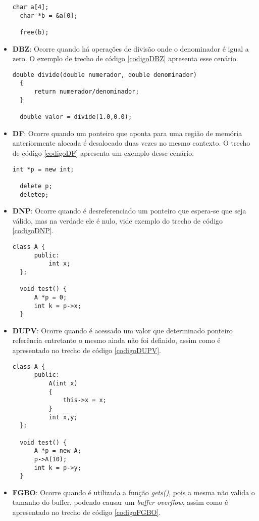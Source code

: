 \begin{itemize}
    \begin{lstlisting}[caption={Código exemplo BF}, label=codigoBF]
  char a[4];
  char *b = &a[0];

  free(b);
    \end{lstlisting}
  \item \textbf{DBZ}: Ocorre quando há operações de divisão onde o denominador é igual a zero. O exemplo de trecho de código 
    \ref{codigoDBZ} apresenta esse cenário.

    \begin{lstlisting}[caption={Código exemplo DBZ}, label=codigoDBZ]
  double divide(double numerador, double denominador)
  {
      return numerador/denominador;
  }

  double valor = divide(1.0,0.0);
    \end{lstlisting}
  \item \textbf{DF}: Ocorre quando um ponteiro que aponta para uma região de memória anteriormente alocada é desalocado duas 
    vezes no mesmo contexto. O trecho de código \ref{codigoDF} apresenta um exemplo desse cenário.

    \begin{lstlisting}[caption={Código exemplo DF}, label=codigoDF]
  int *p = new int;

  delete p;
  deletep;
    \end{lstlisting}
  \item \textbf{DNP}: Ocorre quando é desreferenciado um ponteiro que espera-se que seja válido, mas na verdade ele é nulo, 
    vide exemplo do trecho de código \ref{codigoDNP}.

    \begin{lstlisting}[caption={Código exemplo DNP}, label=codigoDNP]
  class A {
      public:
          int x;
  };

  void test() {
      A *p = 0;
      int k = p->x;
  } 
    \end{lstlisting}
  \item \textbf{DUPV}: Ocorre quando é acessado um valor que determinado ponteiro referência entretanto o mesmo ainda não foi 
    definido, assim como é apresentado no trecho de código \ref{codigoDUPV}.

    \begin{lstlisting}[caption={Código exemplo DUPV}, label=codigoDUPV]
  class A {
      public:
          A(int x)
          {
              this->x = x;
          }
          int x,y;
  };

  void test() {
      A *p = new A;
      p->A(10);
      int k = p->y;
  } 
    \end{lstlisting}
  \item \textbf{FGBO}: Ocorre quando é utilizada a função \textit{gets()}, pois a mesma não valida o tamanho do buffer, podendo 
    causar um \textit{buffer overflow}, assim como é apresentado no trecho de código \ref{codigoFGBO}.


\end{itemize}
